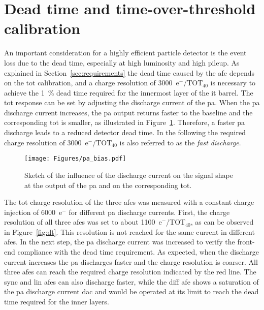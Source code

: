 
\section{Dead time and time-over-threshold calibration}
\label{sec:deadtime}

An important consideration for a highly efficient particle detector is the event loss due to the dead time, especially at high luminosity and high pileup.
As explained in Section~\ref{sec:requirements} the dead time caused by the \gls{afe} depends on the \gls{tot} calibration, and a charge resolution of \num{3000}~e${^{-}}$/TOT$_{40}$ is necessary to achieve the \SI{1}{\percent} dead time required for the innermost layer of the \gls{it} barrel.
The \gls{tot} response can be set by adjusting the discharge current of the \gls{pa}. When the \gls{pa} discharge current increases, the \gls{pa} output returns faster to the baseline and the corresponding \gls{tot} is smaller, as illustrated in Figure~\ref{fig:discharge-schetch}. Therefore, a faster \gls{pa} discharge leads to a reduced detector dead time. In the following the required charge resolution of \num{3000}~e${^{-}}$/TOT$_{40}$ is also referred to as the \emph{fast discharge}.

\begin{figure}[ht]
    \centering
    \texttt{[image: Figures/pa\_bias.pdf]}
    \caption{Sketch of the influence of the discharge current on the signal shape at the output of the \gls{pa} and on the corresponding \gls{tot}.}
    \label{fig:discharge-schetch}
\end{figure}

The \gls{tot} charge resolution of the three \gls{afe}s was measured with a constant charge injection of \num{6000}~e${^{-}}$ for different \gls{pa} discharge currents. First, the charge resolution of all three \gls{afe}s was set to about \num{1100}~e${^{-}}$/TOT$_{40}$, as can be observed in Figure~\ref{fig:dt}. This resolution is not reached for the same current in different \gls{afe}s. %
In the next step, the \gls{pa} discharge current was increased to verify the front-end compliance with the dead time requirement. As expected, when the discharge current increases the \gls{pa} discharges faster and the charge resolution is coarser.
All three \gls{afe}s can reach the required charge resolution indicated by the red line. The \gls{sync} and \gls{lin} \glspl{afe} can also discharge faster, while the \gls{diff} \gls{afe} shows a saturation of the \gls{pa} discharge current \gls{dac} and would be operated at its limit to reach the dead time required for the inner layers.

